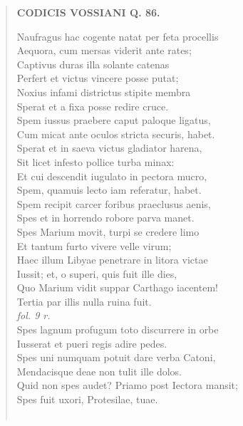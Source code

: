 \documentclass[11pt, a4paper]{report}
\begin{document}
\begin{verse}
    \begin{center} \textbf{CODICIS VOSSIANI Q. 86.} \end{center} \marginpar{[201]} Naufragus hac cogente natat per feta procellis \\ Aequora, cum mersas viderit ante rates; \\ Captivus duras illa solante catenas \\ Perfert et victus vincere posse putat; \\ Noxius infami districtus stipite membra \\ Sperat et a fixa posse redire cruce. \\ Spem iussus praebere caput paloque ligatus, \\ Cum micat ante oculos stricta securis, habet. \\ Sperat et in saeva victus gladiator harena, \\ Sit licet infesto pollice turba minax: \\ Et cui descendit iugulato in pectora mucro, \\ Spem, quamuis lecto iam referatur, habet. \\ Spem recipit carcer foribus praeclusus aenis, \\ Spes et in horrendo robore parva manet. \\ Spes Marium movit, turpi se credere limo \\ Et tantum furto vivere velle virum; \\ Haec illum Libyae penetrare in litora victae \\ Iussit; et, o superi, quis fuit ille dies, \\ Quo Marium vidit suppar Carthago iacentem! \\ Tertia par illis nulla ruina fuit. \\ \textit{fol. 9 r.} \\ Spes lagnum profugum toto discurrere in orbe \\ Iusserat et pueri regis adire pedes. \\ Spes uni numquam potuit dare verba Catoni, \\ Mendacisque deae non tulit ille dolos. \\ Quid non spes audet? Priamo post Iectora mansit; \\ Spes fuit uxori, Protesilae, tuae. \\ 
        ﻿\pagebreak 

\end{verse}
\end{document}

